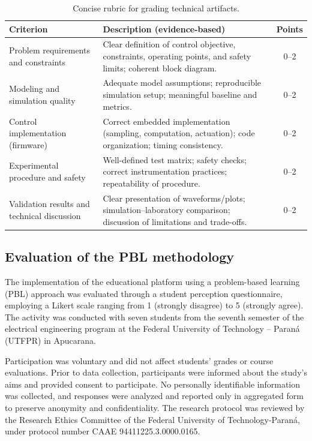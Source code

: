 \documentclass[english]{textolivre}
\begin{document}
\begin{table}[htpb]
\centering
\begin{threeparttable}
\caption{Concise rubric for grading technical artifacts.}
\label{tab:rubric}
\begin{tabular}{p{6.2cm}p{6cm}c}

\toprule 
Criterion & Description (evidence-based) & Points \\
\midrule
Problem requirements and constraints
& Clear definition of control objective, constraints, operating points, and safety limits; coherent block diagram.
& 0--2 \\
Modeling and simulation quality
& Adequate model assumptions; reproducible simulation setup; meaningful baseline and metrics.
& 0--2 \\
Control implementation (firmware)
& Correct embedded implementation (sampling, computation, actuation); code organization; timing consistency.
& 0--2 \\
Experimental procedure and safety
& Well-defined test matrix; safety checks; correct instrumentation practices; repeatability of procedure.
& 0--2 \\
Validation results and technical discussion
& Clear presentation of waveforms/plots; simulation--laboratory comparison; discussion of limitations and trade-offs.
& 0--2 \\
\bottomrule
\end{tabular}
\end{threeparttable}
\end{table}


\FloatBarrier
\subsection{Evaluation of the PBL methodology}
The implementation of the educational platform using a problem-based learning (PBL) approach was evaluated through a student perception questionnaire, employing a Likert scale ranging from 1 (strongly disagree) to 5 (strongly agree). The activity was conducted with seven students from the seventh semester of the electrical engineering program at the Federal University of Technology – Paraná (UTFPR) in Apucarana.

Participation was voluntary and did not affect students’ grades or course evaluations. Prior to data collection, participants were informed about the study's aims and provided consent to participate. No personally identifiable information was collected, and responses were analyzed and reported only in aggregated form to preserve anonymity and confidentiality. The research protocol was reviewed by the Research Ethics Committee of the Federal University of Technology-Paraná, under protocol number CAAE 94411225.3.0000.0165.
\end{document}
